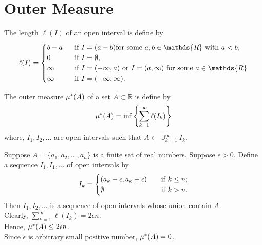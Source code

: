 \section{Outer Measure}
\begin{definition}
    The length $\ell(I)$ of an open interval is define by
    $$
    \ell(I)=
     \begin{cases}
         b-a \ \ &\text{if}\ I=(a-b) \text{for some}\ a,b\in\mathds{R}\ \text{with}\ a<b,\\
         0 \ \ &\text{if}\ I=\emptyset,\\
         \infty\ \ &\tx{if}\ I=(-\infty,a) \ \tx{or}\ I=(a,\infty)\ \tx{for some}\ a\in\mathds{R}\\
         \infty\ \ &\tx{if}\ I=(-\infty,\infty).
    \end{cases}
    $$
\end{definition}

\begin{definition}
    The outer measure $\mu^{*}(A)$ of a set  $A\subset \mathds{R}$ is define by
    \[
        \mu^{*}(A)=\inf \left\{ \sum_{k=1}^{\infty}\ell(I_k) \right\} 
    \]
    where, $I_1,I_2,\ldots$ are open intervals such that $A\subset\cup_{k=1}^{\infty}I_k$.
\end{definition}
\begin{example}
    Suppose $A=\{ a_1,a_2,\ldots,a_n \} $ is a finite set of real numbers. Suppose $\epsilon>0$. Define a sequence  $I_1,I_1,\ldots$ of open intervals
    by
    \[
        I_k=
        \begin{cases}
            (a_k-\epsilon,a_k+\epsilon)\ \ \ &\text{if}\ k\le n;\\
            \emptyset \ &\text{if}\ k>n.
        \end{cases}
    \]
    Then $I_1,I_2,\ldots$ is a sequence of open intervals whose union contain $A$. \\
    Clearly,  $\sum_{k=1}^{\infty}\ell(I_k)=2\epsilon n$.\\
    Hence, $\mu^{*}(A)\le 2\epsilon n$.\\
    Since $\epsilon$ is arbitrary small positive number,  $\mu^{*}(A)=0$.
\end{example}

